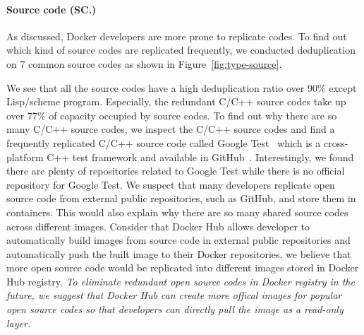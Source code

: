 

\paragraph{Source code (SC.)}


As discussed, Docker developers are more prone to replicate codes. 
To find out which kind of source codes are replicated frequently, we conducted deduplication on 7 common source codes as shown in Figure~\ref{fig:type-source}.

We see that all the source codes have a high deduplication ratio over 90\% except 
Lisp/scheme program. Especially, the redundant C/C++ source codes take up over 77\% of capacity occupied by source codes. To find out why there are so many C/C++ source codes, we inspect the C/C++ source codes and find a frequently replicated C/C++ source code called Google Test~\cite{xxx} which is a cross-platform C++ test framework and available in GitHub~\cite{xxx}. Interestingly, we found there are plenty of repositories related to Google Test while there is no official repository for Google Test. We suspect that many developers replicate open source code from external public repositories, such as GitHub, and store them in containers. This would also explain why there are so many shared source codes across different images.
Consider that Docker Hub allows developer to automatically build images from source code in external public repositories and automatically push the built image to their Docker repositories, we believe that more open source code would be replicated into different images stored in Docker Hub registry. \textit{To eliminate redundant open source codes in Docker registry in the future, we suggest that Docker Hub can create more offical images for popular open source codes so that developers can directly pull the image as a read-only layer. }

